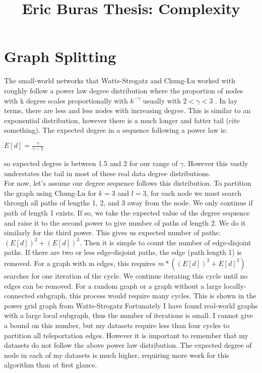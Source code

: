 \documentclass{article}
\begin{document}
\title{Eric Buras Thesis: Complexity}

\maketitle

\section{Graph Splitting}
The small-world networks that Watts-Strogatz and Chung-Lu worked with roughly follow a power law degree distribution where the proportion of nodes with k degree scales proportionally with $k^{-\gamma}$ usually with $2 < \gamma < 3$ \cite{Chung:2004,Watts:1998}. In lay terms, there are less and less nodes with increasing degree. This is similar to an exponential distribution, however there is a much longer and fatter tail (cite something). The expected degree in a sequence following a power law is:\\
\begin{center}
$E[d] = \frac{\gamma}{\gamma - 1} $ 
\end{center}
so expected degree is between 1.5 and 2 for our range of $\gamma$. However this vastly understates the tail in most of these real data degree distributions.\\
For now, let's assume our degree sequence follows this distribution. To partition the graph using Chung-Lu for $k = 3$ and $l = 3$, for each node we must search through all paths of lengths 1, 2, and 3 away from the node. We only continue if path of length 1 exists. If so, we take the expected value of the degree sequence and raise it to the second power to give number of paths of length 2. We do it similarly for the third power. This gives us expected number of paths: $(E[d])^{2}+(E[d])^{3}$. Then it is simple to count the number of edge-disjoint paths. If there are two or less edge-disjoint paths, the edge (path length 1) is removed. For a graph with m edges, this requires $m*((E[d])^{2}+E[d]^{3})$ searches for one iteration of the cycle. We continue iterating this cycle until no edges can be removed. For a random graph or a graph without a large locally-connected subgraph, this process would require many cycles. This is shown in the power grid graph from Watts-Strogatz \cite{Watts:1998} Fortunately I have found real-world graphs with a large local subgraph, thus the number of iterations is small. I cannot give a bound on this number, but my datasets require less than four cycles to partition all teleportation edges. However it is important to remember that my datasets do not follow the above power law distribution. The expected degree of node in each of my datasets is much higher, requiring more work for this algorithm than at first glance.
\end{document}
